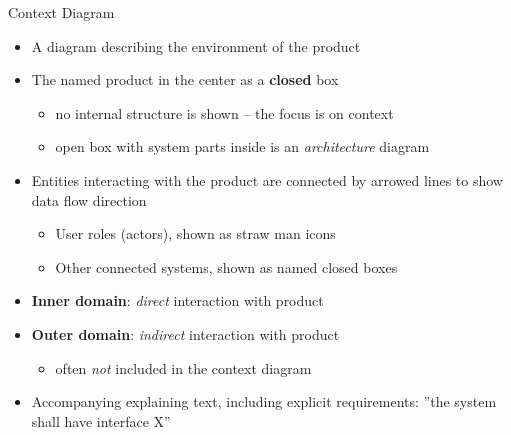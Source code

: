\begin{Slide}{Context Diagram}

\begin{itemize}
\item A diagram describing the environment of the product
\item The named product in the center as a \textbf{closed} box
\begin{itemize}
\item no internal structure is shown -- the focus is on context
\item open box with system parts inside is an \textit{architecture} diagram

\end{itemize}
\item Entities interacting with the product are connected by arrowed lines to show data flow direction
\begin{itemize}
\item User roles (actors), shown as straw man icons
\item Other connected systems, shown as named closed boxes
\end{itemize}
\item \textbf{Inner domain}: \textit{direct} interaction with product
\item \textbf{Outer domain}: \textit{indirect} interaction with product
\begin{itemize}
\item often \textit{not} included in the context diagram
\end{itemize}
\item Accompanying explaining text, including explicit requirements: ''the system shall have interface X''


\end{itemize}
\end{Slide}